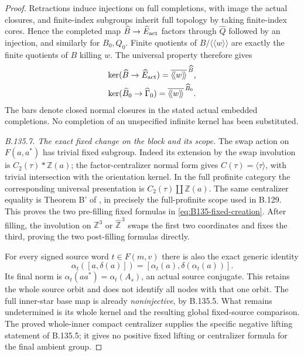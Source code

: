 \begin{proof}
Retractions induce injections on full completions, with image
the actual closures, and finite-index subgroups inherit full
topology by taking finite-index cores. Hence the completed
map $\widehat B\to\widehat E_{\rm act}$ factors through
$\widehat Q$ followed by an injection, and similarly for
$B_0,Q_0$. Finite quotients of $B/\langle\!\langle w\rangle\!\rangle$
are exactly the finite quotients of $B$ killing $w$.
The universal property therefore gives
\begin{equation}\label{eq:B135-closed-kernels}
 \begin{gathered}
 \ker(\widehat B\to\widehat E_{\rm act})
   =\overline{\langle\!\langle w\rangle\!\rangle}^{\,\widehat B},\\
 \ker(\widehat B_0\to\widehat\Gamma_0)
   =\overline{\langle\!\langle w\rangle\!\rangle}^{\,\widehat B_0}.
 \end{gathered}
\end{equation}
The bars denote closed normal closures in the stated actual
embedded completions. No completion of an unspecified
infinite kernel has been substituted.

\emph{B.135.7. The exact fixed change on the block and its scope.}
The swap action on $F(a,a^*)$ has trivial fixed subgroup.
Indeed its extension by the swap involution is
$C_2(\tau)*\mathbb Z(a)$; the factor-centralizer normal form
gives $C(\tau)=\langle\tau\rangle$, with trivial intersection
with the orientation kernel. In the full profinite category
the corresponding universal presentation is
$C_2(\tau)\amalg\widehat{\mathbb Z}(a)$.
The same centralizer equality is Theorem B' of
\citet{A_HR1985}, in precisely the full-profinite scope used
in B.129. This proves the two pre-filling fixed formulas in
\eqref{eq:B135-fixed-creation}. After filling, the involution
on $\mathbb Z^3$ or $\widehat{\mathbb Z}^{\,3}$ swaps the
first two coordinates and fixes the third, proving the two
post-filling formulas directly.

For every signed source word $t\in F(m,v)$ there is also the
exact generic identity
\[
 \alpha_t([a,\delta(a)])
   =[\alpha_t(a),\delta(\alpha_t(a))].
\]
Its final norm is
$\alpha_t(aa^*)=\alpha_t(A_s)$, an actual source conjugate.
This retains the whole source orbit and does not identify
all nodes with that one orbit. The full inner-star base map
is already \emph{noninjective}, by B.135.5. What remains
undetermined is its whole kernel and the resulting global
fixed-source comparison. The proved whole-inner compact
centralizer supplies the specific negative lifting statement
of B.135.5; it gives no positive fixed lifting or centralizer
formula for the final ambient group.
\end{proof}

